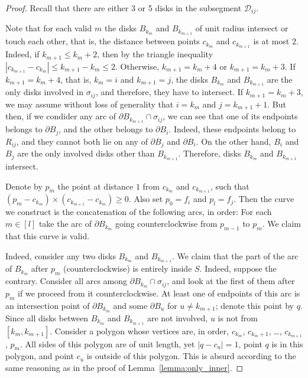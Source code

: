 \begin{proof}%
Recall that there are either 3 or 5 disks in the subsegment $\mathcal{D}_{ij}$.

Note that for each valid $m$ the disks $B_{k_m}$ and $B_{k_{m+1}}$ of unit radius intersect or touch each other, that is, the distance between points $c_{k_m}$ and $c_{k_{m+1}}$ is at most $2$. Indeed, if $k_{m+1}\leq k_m + 2$, then by the triangle inequality $|c_{k_{m+1}} - c_{k_m}|\leq k_{m+1}-k_m\leq 2$. 
Otherwise, $k_{m+1} = k_m + 4$ or $k_{m+1} = k_m + 3$. If $k_{m+1} = k_m + 4$, that is, $k_m = i$ and $k_{m+1} = j$, the disks $B_{k_m}$ and $B_{k_{m+1}}$ are the only disks involved in $\sigma_{ij}$, and therefore, they have to intersect. If $k_{m+1} = k_m + 3$, we may assume without loss of generality that $i = k_m$ and $j = k_{m+1} + 1$.
But then, if we condider any arc of $\partial B_{k_{m+1}}\cap \sigma_{ij}$, we can see that one of its endpoints belongs to $\partial B_j$, and the other belongs to $\partial B_i$. Indeed, these endpoints belong to $R_{ij}$, and they cannot both lie on any of $\partial{B_j}$ and $\partial{B_i}$. On the other hand, $B_i$ and $B_j$ are the only involved disks other than $B_{k_{m+1}}$. Therefore, disks $B_{k_m}$ and $B_{k_{m+1}}$ intersect.

Denote by $p_m$ the point at distance $1$ from $c_{k_m}$ and $c_{k_{m+1}}$, such that $(p_m - c_{k_m})\times(c_{k_{m+1}} - c_{k_m})\geq 0$.
Also set $p_0 = f_i$ and $p_l = f_j$. Then the curve we construct is the concatenation of the following arcs, in order: For each $m\in[l]$ take the arc of $\partial B_{k_m}$ going counterclockwise from $p_{m-1}$ to $p_m$. We claim that this curve is valid.

Indeed, consider any two disks $B_{k_m}$ and $B_{k_{m+1}}$. We claim that the part of the arc of $B_{k_m}$ after $p_m$ (counterclockwise) is entirely inside $S$. Indeed, suppose the contrary.
Consider all arcs among $\partial{B_{k_m}}\cap \sigma_{ij}$, and look at the first of them after $p_m$ if we proceed from it counterclockwise. At least one of endpoints of this arc is an intersection point of $\partial{B_{k_m}}$ and some $\partial{B_u}$ for $u\neq k_{m+1}$; denote this point by $q$.
Since all disks between $B_{k_m}$ and $B_{k_{m+1}}$ are not involved, $u$ is not from $[k_m, k_{m+1}]$. Consider a polygon whose vertices are, in order, $c_{k_m}$, $c_{k_m + 1}$, \ldots, $c_{k_{m+1}}$, $p_m$. All sides of this polygon are of unit length, yet $|q - c_u| = 1$, point $q$ is in this polygon, and point $c_u$ is outside of this polygon. This is absurd according to the same reasoning as in the proof of Lemma~\ref{lemma:only_inner}.


\end{proof}

